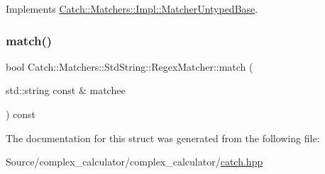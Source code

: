Implements \mbox{\hyperlink{class_catch_1_1_matchers_1_1_impl_1_1_matcher_untyped_base_a91d3a907dbfcbb596077df24f6e11fe2}{Catch\+::\+Matchers\+::\+Impl\+::\+Matcher\+Untyped\+Base}}.

\mbox{\label{struct_catch_1_1_matchers_1_1_std_string_1_1_regex_matcher_aa8e61adccabb2f36133029301f6b8f4e}} 
\subsubsection{\texorpdfstring{match()}{match()}}
{\footnotesize\ttfamily bool Catch\+::\+Matchers\+::\+Std\+String\+::\+Regex\+Matcher\+::match (\begin{DoxyParamCaption}\item[{std\+::string const \&}]{matchee }\end{DoxyParamCaption}) const\hspace{0.3cm}{\ttfamily [override]}}



The documentation for this struct was generated from the following file\+:\begin{DoxyCompactItemize}
\item 
Source/complex\+\_\+calculator/complex\+\_\+calculator/\mbox{\hyperlink{catch_8hpp}{catch.\+hpp}}\end{DoxyCompactItemize}
